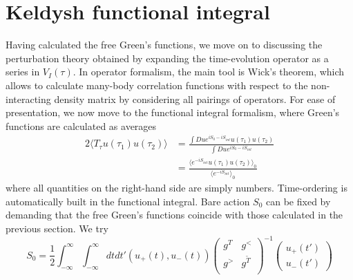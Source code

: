 \section{Keldysh functional integral}

Having calculated the free Green's functions, we move on to discussing the perturbation theory obtained by expanding the time-evolution operator as a series in $V_I(\tau)$. In operator formalism, the main tool is Wick's theorem, which allows to calculate many-body correlation functions with respect to the non-interacting density matrix by considering all pairings of operators. For ease of presentation, we now move to the functional integral formalism, where Green's functions are calculated as averages
\begin{alignat}{2}
 \langle T_\tau u(\tau_1) u(\tau_2) \rangle &= \frac{ \int Du e^{iS_0-iS_{int}}u(\tau_1) u(\tau_2)}{ \int Du e^{iS_0-iS_{int}}} \\
  &= \frac{\langle e^{-iS_{int}}u(\tau_1)u(\tau_2) \rangle_0}{\langle e^{-iS_{int}} \rangle_0}
\end{alignat}
where all quantities on the right-hand side are simply numbers. Time-ordering is automatically built in the functional integral. Bare action $S_0$ can be fixed by demanding that the free Green's functions coincide with those calculated in the previous section. We try
\begin{equation}
 S_0 = \frac{1}{2} \int_{-\infty}^{\infty}\int_{-\infty}^{\infty} dt dt' (u_+(t),u_-(t))\left(\begin{matrix}
      g^T & g^< \\
      g^> & g^{\tilde{T}} \\
     \end{matrix}\right)^{-1} \left(\begin{matrix} u_+(t') \\ u_-(t') \end{matrix} \right) 
\end{equation}

